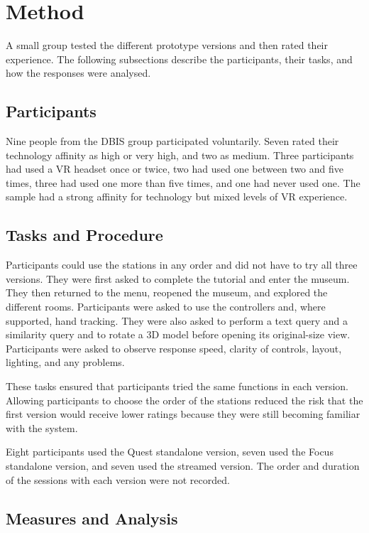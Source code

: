 \section{Method}

A small group tested the different prototype versions and then rated their experience. The following subsections describe the participants, their tasks, and how the responses were analysed.

\subsection{Participants}

Nine people from the DBIS group participated voluntarily. Seven rated their technology affinity as high or very high, and two as medium. Three participants had used a VR headset once or twice, two had used one between two and five times, three had used one more than five times, and one had never used one. The sample had a strong affinity for technology but mixed levels of VR experience.

\enlargethispage{\baselineskip}
\subsection{Tasks and Procedure}

Participants could use the stations in any order and did not have to try all three versions. They were first asked to complete the tutorial and enter the museum. They then returned to the menu, reopened the museum, and explored the different rooms. Participants were asked to use the controllers and, where supported, hand tracking. They were also asked to perform a text query and a similarity query and to rotate a 3D model before opening its original-size view. Participants were asked to observe response speed, clarity of controls, layout, lighting, and any problems.

These tasks ensured that participants tried the same functions in each version. Allowing participants to choose the order of the stations reduced the risk that the first version would receive lower ratings because they were still becoming familiar with the system.

Eight participants used the Quest standalone version, seven used the Focus standalone version, and seven used the streamed version. The order and duration of the sessions with each version were not recorded.

\enlargethispage{\baselineskip}
\subsection{Measures and Analysis}

